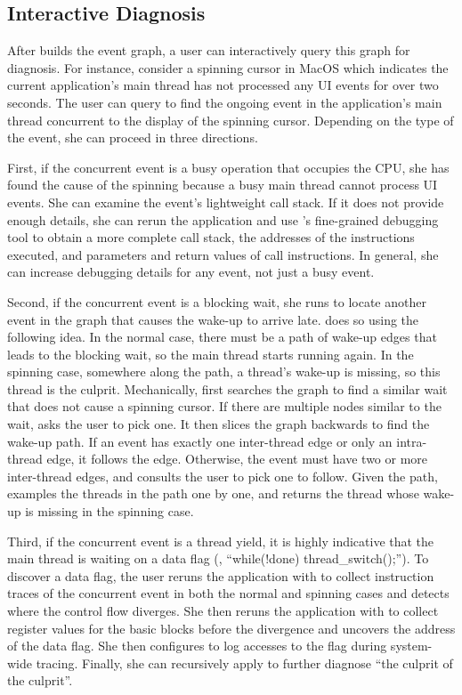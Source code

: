 \subsection{Interactive Diagnosis} \label{subsec:debug}

After \xxx builds the event graph, a user can interactively query this graph
for diagnosis.  For instance, consider a spinning cursor in MacOS which
indicates the current application's main thread has not processed any UI events
for over two seconds.  The user can query \xxx to find the ongoing event in the
application's main thread concurrent to the display of the spinning cursor.
Depending on the type of the event, she can proceed in three directions.

First, if the concurrent event is a busy operation that occupies the CPU, she
has found the cause of the spinning because a busy main thread cannot process
UI events.  She can examine the event's lightweight call stack.  If it does not
provide enough details, she can rerun the application and use \xxx's
fine-grained debugging tool to obtain a more complete call stack, the addresses
of the instructions executed, and parameters and return values of call
instructions.  In general, she can increase debugging details for any event,
not just a busy event.

Second, if the concurrent event is a blocking wait, she runs \xxx to locate
another event in the graph that causes the wake-up to arrive late. \xxx does so
using the following idea.  In the normal case, there must be a path of wake-up
edges that leads to the blocking wait, so the main thread starts running again.
In the spinning case, somewhere along the path, a thread's wake-up is missing,
so this thread is the culprit.  Mechanically, \xxx first searches the graph to
find a similar wait that does not cause a spinning cursor.  If there are
multiple nodes similar to the wait, \xxx asks the user to pick one.  It then
slices the graph backwards to find the wake-up path.  If an event has exactly
one inter-thread edge or only an intra-thread edge, it follows the edge.
Otherwise, the event must have two or more inter-thread edges, and \xxx
consults the user to pick one to follow.  Given the path, \xxx examples the
threads in the path one by one, and returns the thread whose wake-up is missing
in the spinning case.

Third, if the concurrent event is a thread yield, it is highly indicative that
the main thread is waiting on a data flag (\eg, ``while(!done)
thread\_switch();'').  To discover a data flag, the user reruns the application
with \xxx to collect instruction traces of the concurrent event in both the
normal and spinning cases and detects where the control flow diverges.  She
then reruns the application with \xxx to collect register values for the basic
blocks before the divergence and uncovers the address of the data flag.  She
then configures \xxx to log accesses to the flag during system-wide tracing.
Finally, she can recursively apply \xxx to further diagnose ``the culprit of
the culprit''. 

